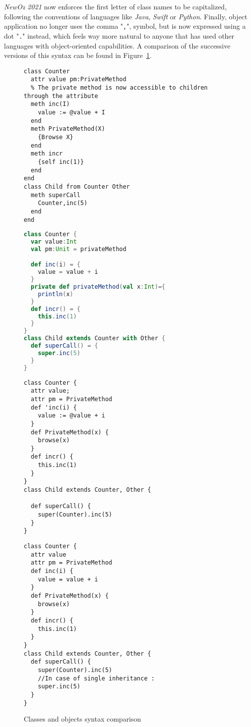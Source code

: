 \textit{NewOz 2021} now enforces the first letter of class names to be capitalized, following the conventions of languages like \textit{Java}, \textit{Swift} or \textit{Python}.
Finally, object application no longer uses the comma "\texttt{,}", symbol, but is now expressed using a dot "\texttt{.}" instead, which feels way more natural to anyone that has used other languages with object-oriented capabilities.\newline
A comparison of the successive versions of this syntax can be found in Figure~\ref{fig:code-comp-obj}.
\begin{figure}
    \noindent\begin{minipage}{.49\textwidth}
\begin{lstlisting}[title={Oz},language=oz]
class Counter
  attr value pm:PrivateMethod
  % The private method is now accessible to children through the attribute
  meth inc(I)
    value := @value + I
  end
  meth PrivateMethod(X)
    {Browse X}
  end
  meth incr
    {self inc(1)}
  end
end
class Child from Counter Other
  meth superCall
    Counter,inc(5)
  end
end
\end{lstlisting}
    \end{minipage}
    \hfill
    \noindent\begin{minipage}{.49\textwidth}
\begin{lstlisting}[title={Scala/Ozma},language=scala]
class Counter {
  var value:Int
  val pm:Unit = privateMethod

  def inc(i) = {
    value = value + i
  }
  private def privateMethod(val x:Int)={
    println(x)
  }
  def incr() = {
    this.inc(1)
  }
}
class Child extends Counter with Other {
  def superCall() = {
    super.inc(5)
  }
}
\end{lstlisting}
    \end{minipage}
    \noindent\begin{minipage}{.49\textwidth}
\begin{lstlisting}[title={NewOz 2020},language=newoz]
class Counter {
  attr value;
  attr pm = PrivateMethod
  def 'inc(i) {
    value := @value + i
  }
  def PrivateMethod(x) {
    browse(x)
  }
  def incr() {
    this.inc(1)
  }
}
class Child extends Counter, Other {

  def superCall() {
    super(Counter).inc(5)
  }
}
\end{lstlisting}
    \end{minipage}
    \hfill
    \noindent\begin{minipage}{.49\textwidth}
\begin{lstlisting}[title={NewOz 2021},language=newoz]
class Counter {
  attr value
  attr pm = PrivateMethod
  def inc(i) {
    value = value + i
  }
  def PrivateMethod(x) {
    browse(x)
  }
  def incr() {
    this.inc(1)
  }
}
class Child extends Counter, Other {
  def superCall() {
    super(Counter).inc(5)
    //In case of single inheritance :
    super.inc(5)
  }
}
\end{lstlisting}
    \end{minipage}
\caption{Classes and objects syntax comparison}
\label{fig:code-comp-obj}
\end{figure}

